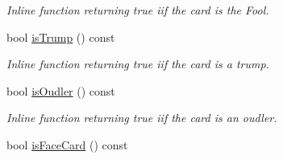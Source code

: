 \begin{DoxyCompactItemize}
\begin{DoxyCompactList}\small\item\em Inline function returning true iif the card is the Fool. \end{DoxyCompactList}\item 
\hypertarget{classCard_ad9674d010674d0a536994147696abc6d}{bool \hyperlink{classCard_ad9674d010674d0a536994147696abc6d}{is\-Trump} () const }\label{classCard_ad9674d010674d0a536994147696abc6d}

\begin{DoxyCompactList}\small\item\em Inline function returning true iif the card is a trump. \end{DoxyCompactList}\item 
\hypertarget{classCard_a8ac4b04ac18721afdff8d504a7621a97}{bool \hyperlink{classCard_a8ac4b04ac18721afdff8d504a7621a97}{is\-Oudler} () const }\label{classCard_a8ac4b04ac18721afdff8d504a7621a97}

\begin{DoxyCompactList}\small\item\em Inline function returning true iif the card is an oudler. \end{DoxyCompactList}\item 
\hypertarget{classCard_ac8978fa4de9e59246381ebd2f9c5ecfc}{bool \hyperlink{classCard_ac8978fa4de9e59246381ebd2f9c5ecfc}{is\-Face\-Card} () const }\label{classCard_ac8978fa4de9e59246381ebd2f9c5ecfc}


\end{DoxyCompactItemize}
